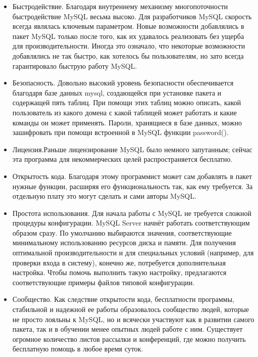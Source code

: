 \begin{itemize}

	\item Быстродействие. Благодаря внутреннему механизму многопоточности быстродействие MySQL весьма высоко. Для разработчиков MySQL скорость всегда являлась ключевым параметром. Новые возможности добавлялись в пакет MySQL только после того, как их удавалось реализовать без ущерба для производительности. Иногда это означало, что некоторые возможности добавлялись не так быстро, как хотелось бы пользователям, но зато всегда гарантировало быструю работу MySQL.

	\item Безопасность. Довольно высокий уровень безопасности обеспечивается благодаря базе данных mysql, создающейся при установке пакета и содержащей пять таблиц. При помощи этих таблиц можно описать, какой пользователь из какого домена с какой таблицей может работать и какие команды он может применять. Пароли, хранящиеся в базе данных, можно зашифровать при помощи встроенной в MySQL функции password().

	\item Лицензия.Раньше лицензирование MySQL было немного запутанным; сейчас эта программа для некоммерческих целей распространяется бесплатно.

	\item Открытость кода. Благодаря этому программист может сам добавлять в пакет нужные функции, расширяя его функциональность так, как ему требуется. За отдельную плату это могут сделать и сами авторы MySQL. 

	\item Простота использования. Для начала работы с MySQL не требуется сложной процедуры конфигурации. MySQL Server начнёт работать соответствующим образом сразу. По умолчанию выбираются значения, соответствующие минимальному использованию ресурсов диска и памяти. Для получения оптимальной производительности и для специальных условий (например, для проверки входа в систему), конечно же, потребуется дополнительная настройка. Чтобы помочь выполнить такую настройку, предлагаются соответствующие примеры файлов типовой конфигурации.

	\item Сообщество. Как следствие открытости кода, бесплатности программы, стабильной и надежной ее работы образовалось сообщество людей, которые не просто лояльны к MySQL, но и всячески участвуют как в развитии самого пакета, так и в обучении менее опытных людей работе с ним. Существует огромное количество листов рассылки и конференций, где можно получить бесплатную помощь в любое время суток.
\end{itemize}

